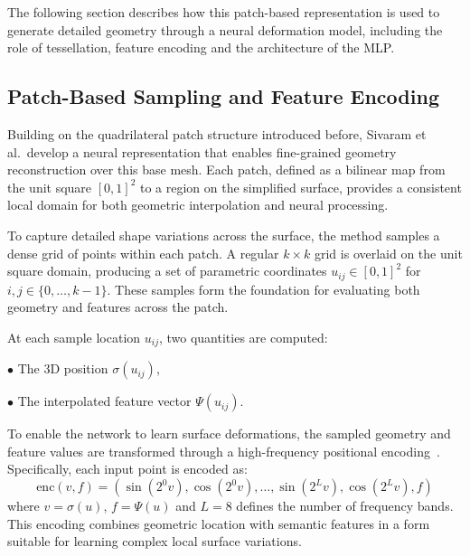 The following section describes how this patch-based representation is used to generate detailed geometry through a neural deformation model, including the role of tessellation, feature encoding and the architecture of the MLP.  





\subsection{Patch-Based Sampling and Feature Encoding}

Building on the quadrilateral patch structure introduced before, Sivaram et al.\ develop a neural representation that enables fine-grained geometry reconstruction over this base mesh.
Each patch, defined as a bilinear map from the unit square $[0,1]^2$ to a region on the simplified surface, provides a consistent local domain for both geometric interpolation and neural processing.

To capture detailed shape variations across the surface, the method samples a dense grid of points within each patch.
A regular $k \times k$ grid is overlaid on the unit square domain, producing a set of parametric coordinates $u_{ij} \in [0,1]^2$ for $i,j \in \{0,\ldots,k-1\}$.
These samples form the foundation for evaluating both geometry and features across the patch.

At each sample location $u_{ij}$, two quantities are computed: 

\quad $\bullet$ The 3D position $\sigma(u_{ij})$,

\quad $\bullet$ The interpolated feature vector $\Psi(u_{ij})$.

To enable the network to learn surface deformations, the sampled geometry and feature values are transformed through a high-frequency positional encoding~\cite{mildenhall2020}.
Specifically, each input point is encoded as: 
\[\text{enc}(v,f) = (\sin(2^0 v), \cos(2^0 v), \ldots, \sin(2^L v), \cos(2^L v), f)\]
where $v = \sigma(u)$, $f = \Psi(u)$ and $L = 8$ defines the number of frequency bands.
This encoding combines geometric location with semantic features in a form suitable for learning complex local surface variations.

